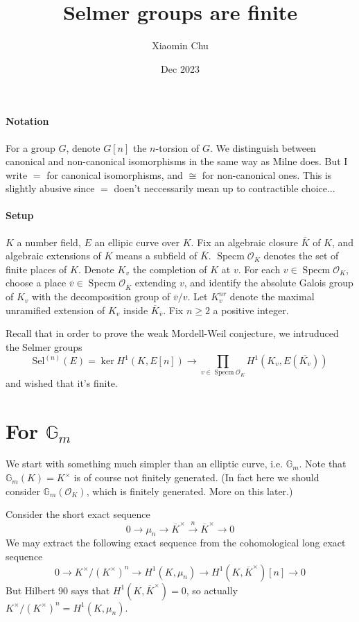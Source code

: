 \documentclass{article}
\title{Selmer groups are finite}
\author{Xiaomin Chu}
\date{Dec 2023}
\newcommand{\ord}{\mathcal{O}}
\newcommand{\mn}{\mu_{n}}
\newcommand{\kmkn}{K ^{\times} / (K ^{\times})^{n}}
\DeclareMathOperator{\spec}{Specm}
\begin{document}
\maketitle

\paragraph{Notation}
For a group $ G $, denote $ G [n] $ the $ n $-torsion of $ G $.
We distinguish between canonical and non-canonical isomorphisms in the same way as Milne does.
But I write $ = $ for canonical isomorphisms, and $ \cong $ for non-canonical ones.
This is slightly abusive since $ = $ doen't neccessarily mean up to contractible choice...

\paragraph{Setup}
$ K $ a number field, $ E $ an ellipic curve over $ K $.
Fix an algebraic closure $ \overline{K} $ of $ K $,
and algebraic extensions of $ K $ means a subfield of $ \overline{K} $.
$ \spec \ord _{K} $ denotes the set of finite places of $ K $.
Denote $ K _{v} $ the completion of $ K $ at $ v $.
For each $ v\in \spec \ord _{K} $, choose a place
$ \overline{v}\in \spec \ord _{\overline{K}} $ extending $ v $,
and identify the absolute Galois group of $ K _{v} $ with
the decomposition group of $ \overline{v}/v $.
Let $ K _{v}^{nr} $ denote the maximal unramified extension of $ K _{v} $
inside $ \overline{K}_{\overline{v}} $.
Fix $ n \geq 2 $ a positive integer.

Recall that in order to prove the weak Mordell-Weil conjecture,
we intruduced the Selmer groups
$$ \mathrm{Sel}^{(n)}(E) = \ker H ^{1}(K, E [n])\to
\prod _{v\in \spec \ord _{K}} H ^{1}(K _{v}, E (\overline{K _{v}})) $$
and wished that it's finite.

\section{For $ \mathbb{G}_{m} $}

We start with something much simpler than an elliptic curve, i.e. $ \mathbb{G}_{m} $.
Note that $ \mathbb{G}_{m}(K) = K ^{\times} $ is of course not finitely generated.
(In fact here we should consider $ \mathbb{G}_{m}(\ord _{K}) $, which is finitely generated.
More on this later.)

Consider the short exact sequence
$$ 0 \to \mn \to \overline{K}^{\times} \xrightarrow{n} \overline{K}^{\times}\to 0 $$
We may extract the following exact sequence from the cohomological long exact sequence
$$ 0\to \kmkn \to H ^{1}(K, \mn)\to H ^{1}(K, \overline{K}^{\times})[n]\to 0  $$
But Hilbert 90 says that $ H ^{1}(K, \overline{K}^{\times}) = 0 $,
so actually $ \kmkn = H ^{1}(K, \mn) $.
\end{document}
